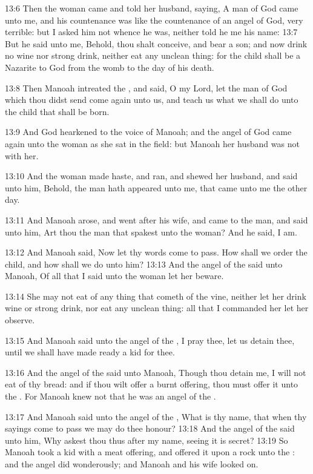 13:6 Then the woman came and told her husband, saying, A man of God came unto me, and his countenance was like the countenance of an angel of God, very terrible: but I asked him not whence he was, neither told he me his name: 13:7 But he said unto me, Behold, thou shalt conceive, and bear a son; and now drink no wine nor strong drink, neither eat any unclean thing: for the child shall be a Nazarite to God from the womb to the day of his death.

13:8 Then Manoah intreated the \LORD, and said, O my Lord, let the man of God which thou didst send come again unto us, and teach us what we shall do unto the child that shall be born.

13:9 And God hearkened to the voice of Manoah; and the angel of God came again unto the woman as she sat in the field: but Manoah her husband was not with her.

13:10 And the woman made haste, and ran, and shewed her husband, and said unto him, Behold, the man hath appeared unto me, that came unto me the other day.

13:11 And Manoah arose, and went after his wife, and came to the man, and said unto him, Art thou the man that spakest unto the woman? And he said, I am.

13:12 And Manoah said, Now let thy words come to pass. How shall we order the child, and how shall we do unto him?  13:13 And the angel of the \LORD said unto Manoah, Of all that I said unto the woman let her beware.

13:14 She may not eat of any thing that cometh of the vine, neither let her drink wine or strong drink, nor eat any unclean thing: all that I commanded her let her observe.

13:15 And Manoah said unto the angel of the \LORD, I pray thee, let us detain thee, until we shall have made ready a kid for thee.

13:16 And the angel of the \LORD said unto Manoah, Though thou detain me, I will not eat of thy bread: and if thou wilt offer a burnt offering, thou must offer it unto the \LORD. For Manoah knew not that he was an angel of the \LORD.

13:17 And Manoah said unto the angel of the \LORD, What is thy name, that when thy sayings come to pass we may do thee honour?  13:18 And the angel of the \LORD said unto him, Why askest thou thus after my name, seeing it is secret?  13:19 So Manoah took a kid with a meat offering, and offered it upon a rock unto the \LORD: and the angel did wonderously; and Manoah and his wife looked on.

